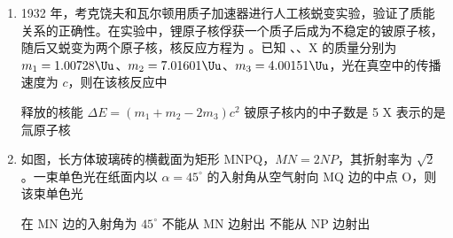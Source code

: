\documentclass[\gkver]{gaokaozhenti}
\begin{document}
\begin{enumerate}
{	$\omega_{\text{舱}} > \omega_{\text{同}},\quad T_{\text{舱}} < T_{\text{同}},\quad a_{\text{舱}} > a_{\text{同}},\quad v_{\text{舱}} > v_{\text{同}}$

	则核心舱角速度比地球同步卫星的大，周期比地球同步卫星的短，向心加速度比地球同步卫星的大，线速度比地球同步卫星的大，故 ABD 错误，C 正确；

	故选 C。
}

\item
1932 年，考克饶夫和瓦尔顿用质子加速器进行人工核蜕变实验，验证了质能关系的正确性。在实验中，锂原子核俘获一个质子后成为不稳定的铍原子核，随后又蜕变为两个原子核，核反应方程为 。已知 、、X 的质量分别为 $m_{1} = 1.00728\Uu$、$m_{2} = 7.01601\Uu$、$m_{3} = 4.00151\Uu$，光在真空中的传播速度为 $c$，则在该核反应中

{释放的核能 $\Delta E = (m_{1} + m_{2} - 2m_{3})c^{2}$}
{铍原子核内的中子数是 5}
{X 表示的是氚原子核}


\item
如图，长方体玻璃砖的横截面为矩形 MNPQ，$MN = 2NP$，其折射率为 $\sqrt{2}$。一束单色光在纸面内以 $\alpha = 45^\circ$ 的入射角从空气射向 MQ 边的中点 O，则该束单色光


{在 MN 边的入射角为 $45^\circ$}
{不能从 MN 边射出}
{不能从 NP 边射出}


\end{enumerate}
\end{document}
